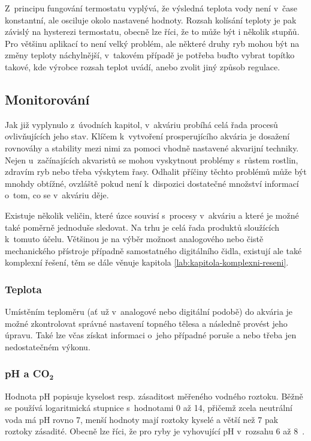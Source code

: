         Z~principu fungování termostatu vyplývá, že výsledná teplota vody není v~čase konstantní, ale osciluje okolo nastavené hodnoty. Rozsah kolísání teploty je pak závislý na hysterezi termostatu, obecně lze říci, že to může být i několik stupňů. Pro většinu aplikací to není velký problém, ale některé druhy ryb mohou být na změny teploty náchylnější, v~takovém případě je potřeba buďto vybrat topítko takové, kde výrobce rozsah teplot uvádí, anebo zvolit jiný způsob regulace. 

    \subsection{Monitorování}
        Jak již vyplynulo z~úvodních kapitol, v~akváriu probíhá celá řada procesů ovlivňujících jeho stav. Klíčem k~vytvoření prosperujícího akvária je dosažení rovnováhy a stability mezi nimi za pomoci vhodně nastavené akvarijní techniky. Nejen u~začínajících akvaristů se mohou vyskytnout problémy s~růstem rostlin, zdravím ryb nebo třeba výskytem řasy. Odhalit příčiny těchto problémů může být mnohdy obtížné, ovzláště pokud není k~dispozici dostatečné množství informací o~tom, co se v~akváriu děje. 
        
        Existuje několik veličin, které úzce souvisí s~procesy v~akváriu a které je možné také poměrně jednoduše sledovat. Na trhu je celá řada produktů sloužících k~tomuto účelu. Většinou je na výběr možnost analogového nebo čistě mechanického přístroje případně samostatného digitálního čidla, existují ale také komplexní řešení, těm se dále věnuje kapitola  \ref{lab:kapitola-komplexni-reseni}. 

        \subsubsection{Teplota}
            Umístěním teploměru (ať už v~analogové nebo digitální podobě) do akvária je možné zkontrolovat správné nastavení topného tělesa a následně provést jeho úpravu. Také lze včas získat informaci o~jeho případné poruše a nebo třeba jen nedostatečném výkonu. 
        \subsubsection{pH a CO\(\mathbf{_{2}}\)}
            Hodnota pH popisuje kyselost resp. zásaditost měřeného vodného roztoku. Běžně se používá logaritmická stupnice s~hodnotami 0 až 14, přičemž zcela neutrální voda má pH rovno 7, menší hodnoty mají roztoky kyselé a větší než 7 pak roztoky zásadité.  Obecně lze říci, že pro ryby je vyhovující pH v~rozsahu 6 až 8~\cite{slavotinek2014}. 

